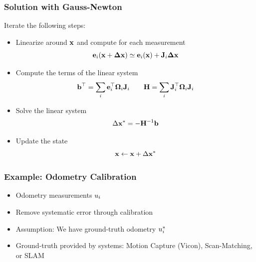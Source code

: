 \begin{frame}
    \frametitle{Solution with Gauss-Newton}
    
    Iterate the following steps:
    \begin{itemize}
        \item Linearize around $\boldsymbol{\mathbf{x}}$ and compute for each measurement
        \begin{equation*}
            \boldsymbol{\mathbf{e}}_{i}(\boldsymbol{\mathbf{x}} + \boldsymbol{\mathbf{\Delta}}\boldsymbol{\mathbf{x}}) \simeq  \boldsymbol{\mathbf{e}}_{i}(\boldsymbol{\mathbf{x}}) + \boldsymbol{\mathbf{J}}_{i}\boldsymbol{\mathbf{\Delta}}\boldsymbol{\mathbf{x}}
        \end{equation*}
        \item Compute the terms of the linear system
        \begin{equation*}
            \boldsymbol{\mathbf{b}}^{\top} = \sum_{i} \boldsymbol{\mathbf{e}}_{i}^{\top} \boldsymbol{\mathbf{\Omega}}_{i} \boldsymbol{\mathbf{J}}_{i} \quad \quad \boldsymbol{\mathbf{H}} = \sum_{i} \boldsymbol{\mathbf{J}}_{i}^{\top} \boldsymbol{\mathbf{\Omega}}_{i} \boldsymbol{\mathbf{J}}_{i}
        \end{equation*}
    \item Solve the linear system
    \begin{equation*}
        \Delta \boldsymbol{\mathbf{x}}^{*} = - {\boldsymbol{\mathbf{H}}}^{-1} \boldsymbol{\mathbf{b}} 
    \end{equation*}
    \item Update the state
    \begin{equation*}
        \boldsymbol{\mathbf{x}} \leftarrow \boldsymbol{\mathbf{x}} + \Delta \boldsymbol{\mathbf{x}}^{*}
    \end{equation*} 
    \end{itemize}
    
\end{frame}

\begin{frame}
    \frametitle{Example: Odometry Calibration}
    
    \begin{itemize}
        \item Odometry measurements $u_{i}$
        \item Remove systematic error through calibration
        \item Assumption: We have ground-truth odometry $u_{i}^{*}$
        \item Ground-truth provided by systems: Motion Capture (Vicon), Scan-Matching, or SLAM
    \end{itemize}
    
\end{frame}

